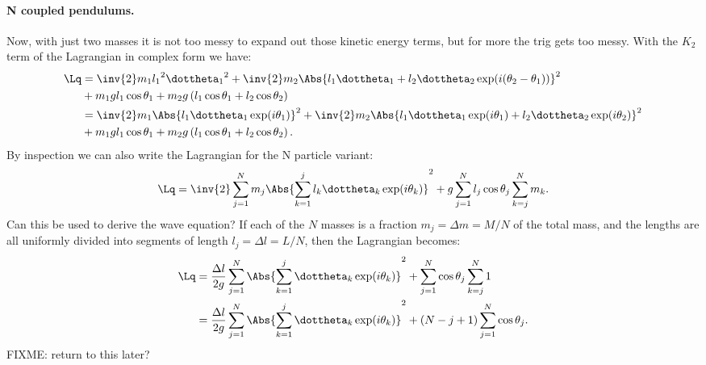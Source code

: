 {\paragraph{N coupled pendulums.}
%
Now, with just two masses it is not too messy to expand out those kinetic energy terms, but for more the trig gets too messy.  With the \(K_2\) term of the Lagrangian in complex form we have:
%
\begin{equation}\label{eqn:tongMf1:320}
\begin{aligned}
\Lq
&=
\inv{2} m_1 {l_1}^2 {\dottheta_1}^2
+ \inv{2} m_2 \Abs{ l_1 \dottheta_1 + l_2 \dottheta_2 \exp(i(\theta_2 -\theta_1)) }^2 \\
&+ m_1 g l_1 \cos\theta_1 + m_2 g \left( l_1 \cos\theta_1 + l_2 \cos\theta_2 \right) \\
&=
\inv{2} m_1 \Abs{l_1 \dottheta_1 \exp(i\theta_1)}^2
+ \inv{2} m_2 \Abs{ l_1 \dottheta_1 \exp(i\theta_1) + l_2 \dottheta_2 \exp(i\theta_2) }^2 \\
&+ m_1 g l_1 \cos\theta_1 + m_2 g \left( l_1 \cos\theta_1 + l_2 \cos\theta_2 \right) .
\end{aligned}
\end{equation}
%
By inspection we can also write the Lagrangian for the N particle variant:
%
\begin{equation}\label{eqn:tongMf1:1280}
\Lq
=
\inv{2} \sum_{j=1}^N m_j \Abs{ \sum_{k=1}^j l_k \dottheta_k \exp(i\theta_k) }^2
+ g \sum_{j=1}^N l_j \cos\theta_j \sum_{k=j}^N m_k.
\end{equation}
%
Can this be used to derive the wave equation?
%
If each of the \(N\) masses is a fraction \(m_j = \Delta m = M/N\) of the total mass, and the lengths are all uniformly divided into segments of length
\(l_j = \Delta l = L/N\), then the Lagrangian becomes:
%
\begin{equation}\label{eqn:tongMf1:340}
\begin{aligned}
\Lq
&= \frac{\Delta l}{2g} \sum_{j=1}^N \Abs{ \sum_{k=1}^j \dottheta_k \exp(i\theta_k) }^2 + \sum_{j=1}^N \cos\theta_j \sum_{k=j}^N 1 \\
&= \frac{\Delta l}{2g} \sum_{j=1}^N \Abs{ \sum_{k=1}^j \dottheta_k \exp(i\theta_k) }^2 + ( N - j + 1 ) \sum_{j=1}^N \cos\theta_j .
\end{aligned}
\end{equation}
%
FIXME: return to this later?
}
